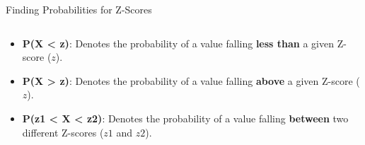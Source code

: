 \documentclass[
  ignorenonframetext,
]{beamer}
\providecommand{\tightlist}{%
  \setlength{\itemsep}{0pt}\setlength{\parskip}{0pt}}
\begin{document}
\begin{frame}{Finding Probabilities for Z-Scores}
\label{finding-probabilities-for-z-scores}
\begin{columns}[T]
\begin{column}{0.48\textwidth}
\begin{itemize}
\tightlist
\item
  \textbf{P(X \textless{} z)}: Denotes the probability of a value
  falling \textbf{less than} a given Z-score (\(z\)).
\end{itemize}

\begin{itemize}
\tightlist
\item
  \textbf{P(X \textgreater{} z)}: Denotes the probability of a value
  falling \textbf{above} a given Z-score (\(z\)).
\end{itemize}

\begin{itemize}
\tightlist
\item
  \textbf{P(z1 \textless{} X \textless{} z2)}: Denotes the probability
  of a value falling \textbf{between} two different Z-scores (\(z1\) and
  \(z2\)).
\end{itemize}
\end{column}


\end{columns}
\end{frame}
\end{document}
